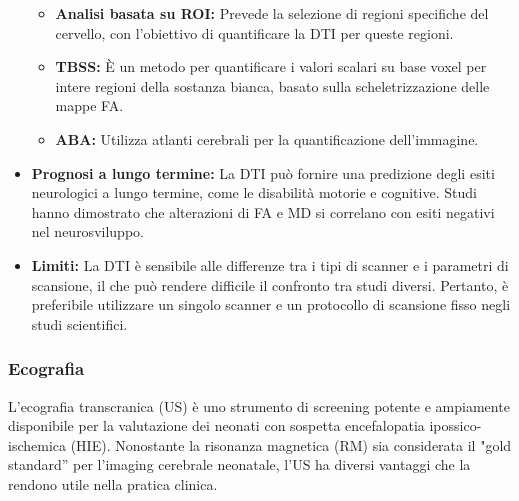 \begin{itemize}
	\begin{itemize}
		\tightlist
		\item
		\textbf{Analisi basata su ROI:} Prevede la selezione di regioni specifiche del cervello, con l'obiettivo di quantificare la DTI per queste regioni.
		\item
		\textbf{TBSS:} È un metodo per quantificare i valori scalari su base voxel per intere regioni della sostanza bianca, basato sulla scheletrizzazione delle mappe FA.
		\item
		\textbf{ABA:} Utilizza atlanti cerebrali per la quantificazione dell'immagine.
	\end{itemize}
	\item
	\textbf{Prognosi a lungo termine:} La DTI può fornire una predizione degli esiti neurologici a lungo termine, come le disabilità motorie e cognitive. Studi hanno dimostrato che alterazioni di FA e MD si correlano con esiti negativi nel neurosviluppo.
	\item
	\textbf{Limiti:} La DTI è sensibile alle differenze tra i tipi di scanner e i parametri di scansione, il che può rendere difficile il confronto tra studi diversi. Pertanto, è preferibile utilizzare un singolo scanner e un protocollo di scansione fisso negli studi scientifici.
\end{itemize}


\subsubsection{Ecografia}

L'ecografia transcranica (US) è uno strumento di screening potente e ampiamente disponibile per la valutazione dei neonati con sospetta encefalopatia ipossico-ischemica (HIE). Nonostante la risonanza magnetica (RM) sia considerata il "gold standard'' per l'imaging cerebrale neonatale, l'US ha diversi vantaggi che la rendono utile nella pratica clinica.

